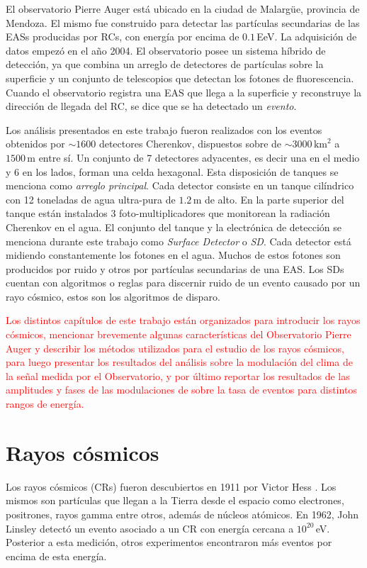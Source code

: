 El observatorio Pierre Auger está ubicado en la ciudad de Malargüe, provincia de Mendoza. El mismo fue construido para detectar las partículas secundarias de las EASs producidas por RCs, con energía por encima de $0.1\,$EeV. La adquisición de datos empezó en el año 2004. El observatorio posee un sistema híbrido de detección, ya que combina un arreglo de detectores de partículas sobre la superficie y un conjunto de telescopios que detectan los fotones de fluorescencia. Cuando el observatorio  registra una EAS que llega a la superficie y reconstruye la dirección de llegada del RC, se dice que se ha detectado un \textit{evento}.


Los análisis presentados en este trabajo fueron realizados con los eventos obtenidos por $\sim 1600$ detectores Cherenkov, dispuestos sobre de $\sim 3000\,\text{km}^2$ a  $1500\,$m entre sí. Un conjunto de 7 detectores adyacentes, es decir una en el medio y 6 en los lados, forman una celda hexagonal. Esta disposición de tanques se menciona como \textit{arreglo principal}.   Cada detector consiste en un tanque cilíndrico con 12 toneladas de agua ultra-pura de $1.2\,$m de alto. En la parte superior del tanque están instalados 3 foto-multiplicadores que monitorean la radiación Cherenkov en el agua. El conjunto del tanque y la electrónica de detección  se menciona durante este trabajo como \textit{Surface Detector} o \textit{SD}.  Cada detector está midiendo constantemente los fotones en el agua. Muchos de estos fotones son producidos por ruido y otros por partículas secundarias de una EAS. Los SDs cuentan con algoritmos o reglas para discernir ruido de un evento causado por un rayo cósmico, estos son los algoritmos de disparo.




\textcolor{red}{Los distintos capítulos de este trabajo están organizados para introducir los rayos cósmicos, mencionar brevemente algunas características del Observatorio Pierre Auger y describir los métodos utilizados para el estudio de los rayos cósmicos, para luego presentar los resultados del análisis sobre la modulación del clima de la señal medida por el Observatorio, y por último reportar los resultados de las amplitudes y fases de las modulaciones de sobre la tasa de eventos para distintos rangos de energía.}
\section{Rayos cósmicos}
Los rayos cósmicos (CRs) fueron descubiertos en 1911 por Victor Hess \cite{hess1912}. Los mismos son partículas que llegan a la Tierra desde el espacio como  electrones, positrones, rayos gamma entre otros, además de núcleos atómicos. En 1962, John Linsley detectó un evento asociado a un CR con energía cercana a $10^{20}\,$eV. Posterior a esta medición, otros experimentos encontraron más eventos por encima de esta energía. 

